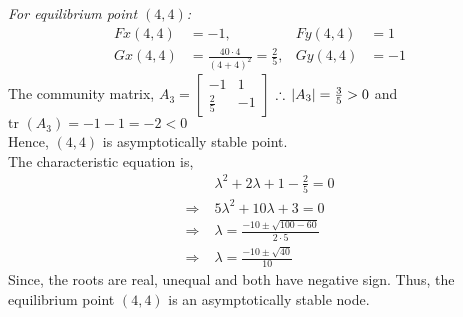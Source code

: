 \documentclass[../main-sheet.tex]{subfiles}
\begin{document}
\begin{soln}
    \emph{For equilibrium point \((4,4)\):}
    \begin{align*}
        Fx(4,4)&=-1, &Fy(4,4)&=1\\
        Gx(4,4)&=\frac{40\cdot4}{(4+4)^2}=\frac{2}{5}, &Gy(4,4)&=-1
    \end{align*}
    The community matrix, \(A_3=\begin{bmatrix}
        -1 & 1 \\
        \frac{2}{5} & -1
    \end{bmatrix}\)
    \(\therefore \, \left\vert A_3\right\vert=\frac{3}{5}>0\) and \(\text{tr }(A_3)=-1-1=-2<0\)\\
    Hence, \((4,4)\) is asymptotically stable point.\\
    The characteristic equation is,
    \begin{align*}
        &\lambda^2+2\lambda+1-\frac{2}{5}=0\\
        \Rightarrow\;&5\lambda^2+10\lambda+3=0\\
        \Rightarrow\;&\lambda=\frac{-10\pm \sqrt{100-60}}{2\cdot5}\\
        \Rightarrow\;&\lambda=\frac{-10\pm \sqrt{40}}{10}
    \end{align*}
    Since, the roots are real, unequal and both have negative sign. Thus, the equilibrium point \((4,4)\) is an asymptotically stable node.
\end{soln}
\end{document}
